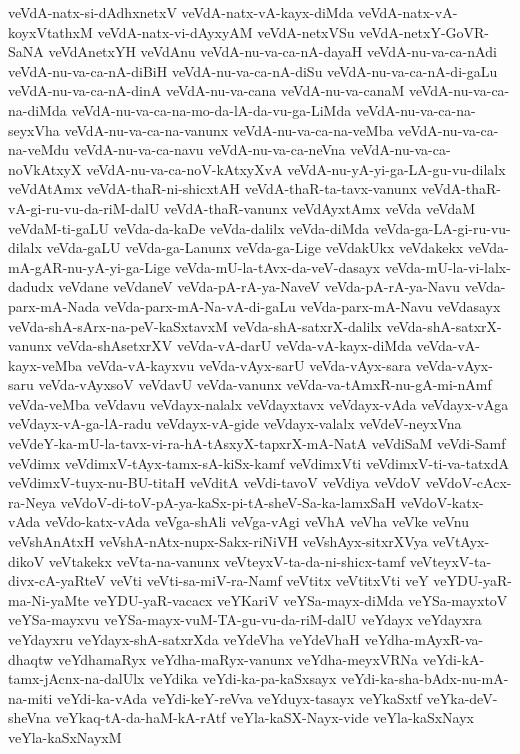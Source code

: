 {veVdA-natx-si-dAdhxnetxV
veVdA-natx-vA-kayx-diMda
veVdA-natx-vA-koyxVtathxM
veVdA-natx-vi-dAyxyAM
veVdA-netxVSu
veVdA-netxY-GoVR-SaNA
veVdAnetxYH
veVdAnu
veVdA-nu-va-ca-nA-dayaH
veVdA-nu-va-ca-nAdi
veVdA-nu-va-ca-nA-diBiH
veVdA-nu-va-ca-nA-diSu
veVdA-nu-va-ca-nA-di-gaLu
veVdA-nu-va-ca-nA-dinA
veVdA-nu-va-cana
veVdA-nu-va-canaM
veVdA-nu-va-ca-na-diMda
veVdA-nu-va-ca-na-mo-da-lA-da-vu-ga-LiMda
veVdA-nu-va-ca-na-seyxVha
veVdA-nu-va-ca-na-vanunx
veVdA-nu-va-ca-na-veMba
veVdA-nu-va-ca-na-veMdu
veVdA-nu-va-ca-navu
veVdA-nu-va-ca-neVna
veVdA-nu-va-ca-noVkAtxyX
veVdA-nu-va-ca-noV-kAtxyXvA
veVdA-nu-yA-yi-ga-LA-gu-vu-dilalx
veVdAtAmx
veVdA-thaR-ni-shicxtAH
veVdA-thaR-ta-tavx-vanunx
veVdA-thaR-vA-gi-ru-vu-da-riM-dalU
veVdA-thaR-vanunx
veVdAyxtAmx
veVda
veVdaM
veVdaM-ti-gaLU
veVda-da-kaDe
veVda-dalilx
veVda-diMda
veVda-ga-LA-gi-ru-vu-dilalx
veVda-gaLU
veVda-ga-Lanunx
veVda-ga-Lige
veVdakUkx
veVdakekx
veVda-mA-gAR-nu-yA-yi-ga-Lige
veVda-mU-la-tAvx-da-veV-dasayx
veVda-mU-la-vi-lalx-dadudx
veVdane
veVdaneV
veVda-pA-rA-ya-NaveV
veVda-pA-rA-ya-Navu
veVda-parx-mA-Nada
veVda-parx-mA-Na-vA-di-gaLu
veVda-parx-mA-Navu
veVdasayx
veVda-shA-sArx-na-peV-kaSxtavxM
veVda-shA-satxrX-dalilx
veVda-shA-satxrX-vanunx
veVda-shAsetxrXV
veVda-vA-darU
veVda-vA-kayx-diMda
veVda-vA-kayx-veMba
veVda-vA-kayxvu
veVda-vAyx-sarU
veVda-vAyx-sara
veVda-vAyx-saru
veVda-vAyxsoV
veVdavU
veVda-vanunx
veVda-va-tAmxR-nu-gA-mi-nAmf
veVda-veMba
veVdavu
veVdayx-nalalx
veVdayxtavx
veVdayx-vAda
veVdayx-vAga
veVdayx-vA-ga-lA-radu
veVdayx-vA-gide
veVdayx-valalx
veVdeV-neyxVna
veVdeY-ka-mU-la-tavx-vi-ra-hA-tAsxyX-tapxrX-mA-NatA
veVdiSaM
veVdi-Samf
veVdimx
veVdimxV-tAyx-tamx-sA-kiSx-kamf
veVdimxVti
veVdimxV-ti-va-tatxdA
veVdimxV-tuyx-nu-BU-titaH
veVditA
veVdi-tavoV
veVdiya
veVdoV
veVdoV-cAcx-ra-Neya
veVdoV-di-toV-pA-ya-kaSx-pi-tA-sheV-Sa-ka-lamxSaH
veVdoV-katx-vAda
veVdo-katx-vAda
veVga-shAli
veVga-vAgi
veVhA
veVha
veVke
veVnu
veVshAnAtxH
veVshA-nAtx-nupx-Sakx-riNiVH
veVshAyx-sitxrXVya
veVtAyx-dikoV
veVtakekx
veVta-na-vanunx
veVteyxV-ta-da-ni-shicx-tamf
veVteyxV-ta-divx-cA-yaRteV
veVti
veVti-sa-miV-ra-Namf
veVtitx
veVtitxVti
veY
veYDU-yaR-ma-Ni-yaMte
veYDU-yaR-vacacx
veYKariV
veYSa-mayx-diMda
veYSa-mayxtoV
veYSa-mayxvu
veYSa-mayx-vuM-TA-gu-vu-da-riM-dalU
veYdayx
veYdayxra
veYdayxru
veYdayx-shA-satxrXda
veYdeVha
veYdeVhaH
veYdha-mAyxR-va-dhaqtw
veYdhamaRyx
veYdha-maRyx-vanunx
veYdha-meyxVRNa
veYdi-kA-tamx-jAcnx-na-dalUlx
veYdika
veYdi-ka-pa-kaSxsayx
veYdi-ka-sha-bAdx-nu-mA-na-miti
veYdi-ka-vAda
veYdi-keY-reVva
veYduyx-tasayx
veYkaSxtf
veYka-deV-sheVna
veYkaq-tA-da-haM-kA-rAtf
veYla-kaSX-Nayx-vide
veYla-kaSxNayx
veYla-kaSxNayxM
}
